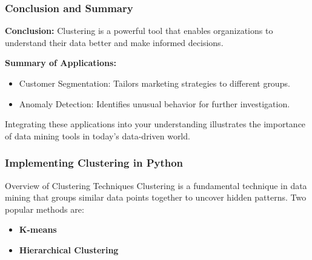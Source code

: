 \documentclass[aspectratio=169]{beamer}
\begin{document}
\begin{frame}[fragile]
    \frametitle{Conclusion and Summary}
    \textbf{Conclusion:}
    Clustering is a powerful tool that enables organizations to understand their data better and make informed decisions. 

    \textbf{Summary of Applications:}
    \begin{itemize}
        \item Customer Segmentation: Tailors marketing strategies to different groups.
        \item Anomaly Detection: Identifies unusual behavior for further investigation.
    \end{itemize}

    Integrating these applications into your understanding illustrates the importance of data mining tools in today’s data-driven world.
\end{frame}

\begin{frame}
    \frametitle{Implementing Clustering in Python}
    \begin{block}{Overview of Clustering Techniques}
        Clustering is a fundamental technique in data mining that groups similar data points together to uncover hidden patterns. Two popular methods are:
        \begin{itemize}
            \item \textbf{K-means}
            \item \textbf{Hierarchical Clustering}
        \end{itemize}
    \end{block}
\end{frame}
\end{document}
